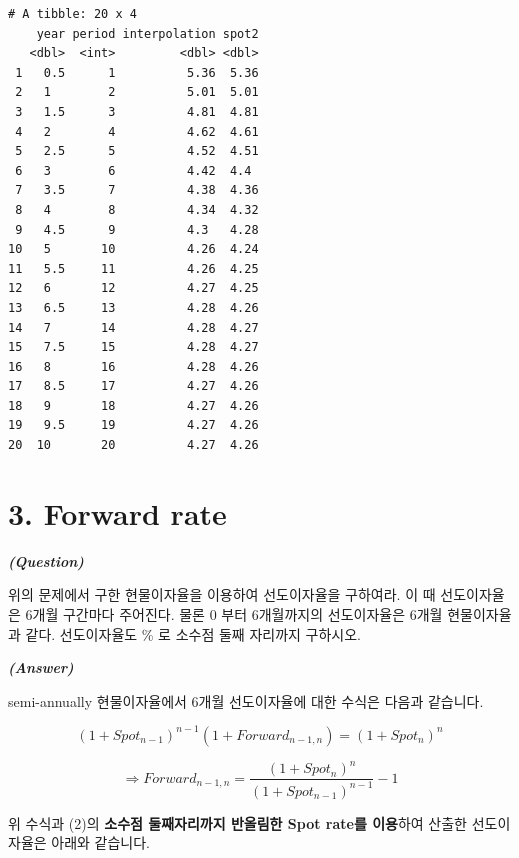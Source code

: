 \documentclass[
  letterpaper,
  DIV=11,
  numbers=noendperiod]{scrreprt}
\begin{document}
\begin{verbatim}
# A tibble: 20 x 4
    year period interpolation spot2
   <dbl>  <int>         <dbl> <dbl>
 1   0.5      1          5.36  5.36
 2   1        2          5.01  5.01
 3   1.5      3          4.81  4.81
 4   2        4          4.62  4.61
 5   2.5      5          4.52  4.51
 6   3        6          4.42  4.4 
 7   3.5      7          4.38  4.36
 8   4        8          4.34  4.32
 9   4.5      9          4.3   4.28
10   5       10          4.26  4.24
11   5.5     11          4.26  4.25
12   6       12          4.27  4.25
13   6.5     13          4.28  4.26
14   7       14          4.28  4.27
15   7.5     15          4.28  4.27
16   8       16          4.28  4.26
17   8.5     17          4.27  4.26
18   9       18          4.27  4.26
19   9.5     19          4.27  4.26
20  10       20          4.27  4.26
\end{verbatim}

\section*{3. Forward rate}\label{forward-rate}


\textbf{\emph{(Question)}}

위의 문제에서 구한 현물이자율을 이용하여 선도이자율을 구하여라. 이 때
선도이자율은 6개월 구간마다 주어진다. 물론 0 부터 6개월까지의
선도이자율은 6개월 현물이자율과 같다. 선도이자율도 \% 로 소수점 둘째
자리까지 구하시오.

\textbf{\emph{(Answer)}}

semi-annually 현물이자율에서 6개월 선도이자율에 대한 수식은 다음과
같습니다.

\[(1+Spot_{n-1})^{n-1}(1+Forward_{n-1,n})=(1+Spot_n)^n\]

\[\Rightarrow Forward_{n-1,n}=\frac{(1+Spot_n)^n}{(1+Spot_{n-1})^{n-1}}-1\]

위 수식과 (2)의 \textbf{소수점 둘째자리까지 반올림한 Spot rate를
이용}하여 산출한 선도이자율은 아래와 같습니다.
\end{document}

